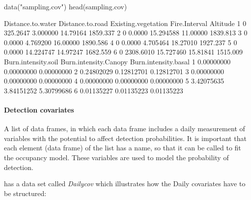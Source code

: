 \documentclass[article]{jss}
\begin{document}
\begin{CodeChunk}
\begin{CodeInput}
data("sampling.cov")
head(sampling.cov)
\end{CodeInput}
\end{CodeChunk}

\begin{CodeChunk}
\begin{CodeOutput}
  Distance.to.water Distance.to.road Existing.vegetation Fire.Interval Altitude
1                 0         325.2647            3.000000      14.79164 1859.337
2                 0           0.0000           15.294588      11.00000 1839.813
3                 0           0.0000            4.769200      16.00000 1890.586
4                 0           0.0000            4.705464      18.27010 1927.237
5                 0           0.0000           14.224747      14.97247 1682.559
6                 0        2308.6010           15.727460      15.81841 1515.009
  Burn.intensity.soil Burn.intensity.Canopy Burn.intensity.basal
1          0.00000000            0.00000000           0.00000000
2          0.24802029            0.12812701           0.12812701
3          0.00000000            0.00000000           0.00000000
4          0.00000000            0.00000000           0.00000000
5          3.42075635            3.84151252           5.30799686
6          0.01135227            0.01135223           0.01135223
\end{CodeOutput}
\end{CodeChunk}

\paragraph{Detection covariates}\label{detection-covariates}

A list of data frames, in which each data frame includes a daily
measurement of variables with the potential to affect detection
probabilities. It is important that each element (data frame) of the
list has a name, so that it can be called to fit the occupancy model.
These variables are used to model the probability of detection.

 has a data set called \emph{Dailycov} which
illustrates how the Daily covariates have to be structured:
\end{document}

